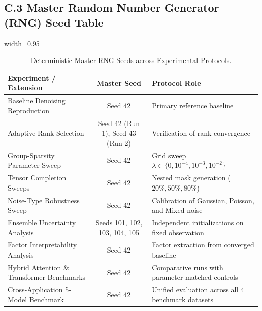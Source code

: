 \subsection*{C.3 Master Random Number Generator (RNG) Seed Table}
\begin{table}[htbp]
\centering
\caption{Deterministic Master RNG Seeds across Experimental Protocols.}
\label{tab:rng_seeds}
\begin{adjustbox}{width=0.95\textwidth}
\begin{tabular}{lcl}
\toprule
\textbf{Experiment / Extension} & \textbf{Master Seed} & \textbf{Protocol Role} \\
\midrule
Baseline Denoising Reproduction & Seed 42 & Primary reference baseline \\
Adaptive Rank Selection & Seed 42 (Run 1), Seed 43 (Run 2) & Verification of rank convergence \\
Group-Sparsity Parameter Sweep & Seed 42 & Grid sweep $\lambda \in \{0, 10^{-4}, 10^{-3}, 10^{-2}\}$ \\
Tensor Completion Sweeps & Seed 42 & Nested mask generation ($20\%, 50\%, 80\%$) \\
Noise-Type Robustness Sweep & Seed 42 & Calibration of Gaussian, Poisson, and Mixed noise \\
Ensemble Uncertainty Analysis & Seeds 101, 102, 103, 104, 105 & Independent initializations on fixed observation \\
Factor Interpretability Analysis & Seed 42 & Factor extraction from converged baseline \\
Hybrid Attention \& Transformer Benchmarks & Seed 42 & Comparative runs with parameter-matched controls \\
Cross-Application 5-Model Benchmark & Seed 42 & Unified evaluation across all 4 benchmark datasets \\
\bottomrule
\end{tabular}
\end{adjustbox}
\end{table}
